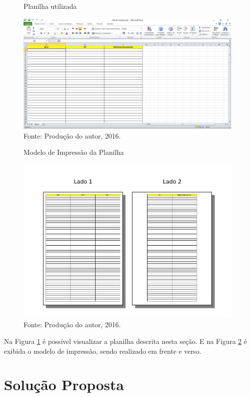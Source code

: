 \documentclass[
	12pt,
	openright,
	oneside, %
	a4paper,
	chapter=TITLE,
	section=TITLE,
	english,
	brazil %
	]{abntex2-udesc}
\begin{document}
\begin{figure}[h]
\caption{Planilha utilizada}\label{fig:planilha}
\centering
\includegraphics[width=\textwidth,keepaspectratio]{figures/lista-excel.pdf}
\caption*{\footnotesize Fonte: Produção do autor, 2016.}
\end{figure}

\begin{figure}[h]
\caption{Modelo de Impressão da Planilha}\label{fig:impressao}
\centering
\includegraphics[width=\textwidth,keepaspectratio]{figures/modelo-impressao.pdf}
\caption*{\footnotesize Fonte: Produção do autor, 2016.}
\end{figure}


Na Figura \ref{fig:planilha} é possível visualizar a planilha descrita nesta seção. E na Figura \ref{fig:impressao} é exibida o modelo de impressão, sendo realizado em frente e verso.

\chapter{Solução Proposta}
\end{document}
